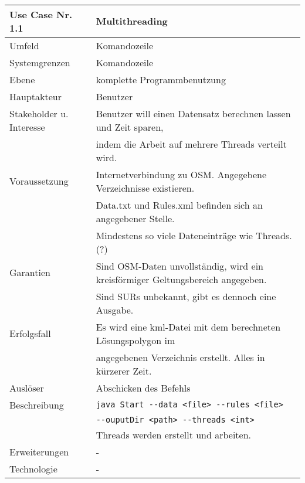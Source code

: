 \\[12pt]
\begin{tabular}{| l | l |}
 \hline
 \textbf{Use Case Nr. 1.1} & Multithreading\\
 \hline
 Umfeld & Komandozeile\\
 \hline
 Systemgrenzen & Komandozeile\\
 \hline
 Ebene & komplette Programmbenutzung\\
 \hline
 Hauptakteur & Benutzer\\
 \hline
 Stakeholder u. Interesse & Benutzer will einen Datensatz berechnen lassen und Zeit sparen,\\
			  & indem die Arbeit auf mehrere Threads verteilt wird.\\
 \hline
 Voraussetzung & Internetverbindung zu OSM. Angegebene Verzeichnisse existieren.\\
	      & Data.txt und Rules.xml befinden sich an angegebener Stelle. \\
	      & Mindestens so viele Dateneinträge wie Threads. (?)\\
 \hline
 Garantien & Sind OSM-Daten unvollständig, wird ein kreisförmiger Geltungsbereich angegeben.\\
	  & Sind SURs unbekannt, gibt es dennoch eine Ausgabe.\\
 \hline
 Erfolgsfall & Es wird eine kml-Datei mit dem berechneten Lösungspolygon im\\
	    & angegebenen Verzeichnis erstellt. Alles in kürzerer Zeit.\\
 \hline
 Auslöser & Abschicken des Befehls\\
 \hline
 Beschreibung & \verb|java Start --data <file> --rules <file>|\\
	      & \hspace{24pt}\verb|--ouputDir <path> --threads <int>|\\
	      & Threads werden erstellt und arbeiten.\\
 \hline
 Erweiterungen & -\\
 \hline
 Technologie & -\\
 \hline
\end{tabular}
